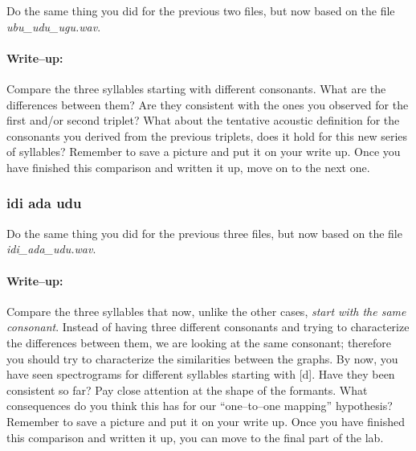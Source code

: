 Do the same thing you did for the previous two files, but now based on the file \emph{ubu\_udu\_ugu.wav}.

\paragraph{Write--up:} Compare the three syllables starting with different consonants. What are the differences between them? Are they consistent with the ones you observed for the first and/or second triplet? What about the tentative acoustic definition for the consonants you derived from the previous triplets, does it hold for this new series of syllables? Remember to save a picture and put it on your write up. Once you have finished this comparison and written it up, move on to the next one.

\subsubsection{idi ada udu}

Do the same thing you did for the previous three files, but now based on the file \emph{idi\_ada\_udu.wav}.

\paragraph{Write--up:} Compare the three syllables that now, unlike the other cases, \emph{start with the same consonant}. Instead of having three different consonants and trying to characterize the differences between them, we are looking at the same consonant; therefore you should try to characterize the similarities between the graphs. By now, you have seen spectrograms for different syllables starting with [d]. Have they been consistent so far? Pay close attention at the shape of the formants. What consequences do you think this has for our ``one--to--one mapping'' hypothesis? Remember to save a picture and put it on your write up. Once you have finished this comparison and written it up, you can move to the final part of the lab.
